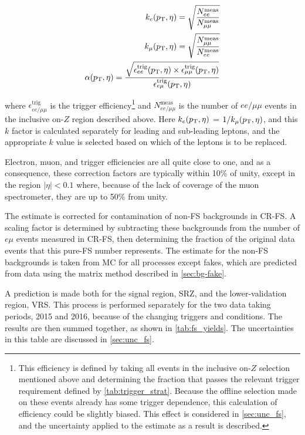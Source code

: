 \begin{eqnarray}\label{eq:kfac}
k_{e}(p_{\text{T}}, \eta) = \sqrt{\frac{N_{ee}^{\text{meas}}}{N_{\mu\mu}^{\text{meas}}}} \\
k_{\mu}(p_{\text{T}}, \eta) = \sqrt{\frac{N_{\mu\mu}^{\text{meas}}}{N_{ee}^{\text{meas}}}} \\
\alpha(p_{\text{T}}, \eta) = \frac{\sqrt{\epsilon^\text{trig}_{ee}(p_{\text{T}},\eta)\times\epsilon^\text{trig}_{\mu\mu}(p_{\text{T}},\eta)}}{\epsilon^\text{trig}_{e\mu}(p_{\text{T}},\eta)}
\label{eq:kandalpha}
\end{eqnarray}

\noindent where $\epsilon^\text{trig}_{ee/\mu\mu}$ is the trigger efficiency\footnote{This efficiency is defined by taking all events in the inclusive on-$Z$ selection mentioned above and determining the fraction that passes the relevant trigger requirement defined by \autoref{tab:trigger_strat}. Because the offline selection made on these events already has some trigger dependence, this calculation of efficiency could be slightly biased. This effect is considered in \autoref{sec:unc_fs}, and the uncertainty applied to the estimate as a result is described.} 
and $N_{ee/\mu\mu}^{\text{meas}}$ 
is the number of $ee/\mu\mu$ events in the inclusive on-$Z$ region described above. 
Here $k_{e}(p_{\text{T}}, \eta)$ = $1/k_{\mu}(p_{\text{T}}, \eta)$, and this $k$ factor is calculated separately for leading and sub-leading leptons, and the appropriate $k$ value is selected based on which of the leptons is to be replaced. 

Electron, muon, and trigger efficiencies are all quite close to one, and as a consequence, these correction factors are typically within 10\% of unity, except in the region $|\eta|<0.1$ where, because of the lack of coverage of the muon spectrometer, they are up to 50\% from unity.

The estimate is corrected for contamination of non-\ac{FS} backgrounds in CR-FS. A scaling factor is determined by subtracting these backgrounds from the number of $e\mu$ events measured in CR-FS, then determining the fraction of the original data events that this pure-\ac{FS} number represents. The estimate for the non-\ac{FS} backgrounds is taken from \ac{MC} for all processes except fakes, which are predicted from data using the matrix method described in \autoref{sec:bg-fake}. 

A prediction is made both for the signal region, SRZ, and the lower-\met validation region, VRS. This process is performed separately for the two data taking periods, 2015 and 2016, because of the changing triggers and conditions. The results are then summed together, as shown in \autoref{tab:fs_yields}. The uncertainties in this table are discussed in \autoref{sec:unc_fs}.

